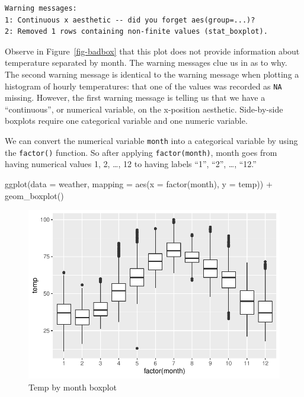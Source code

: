 \documentclass[
  letterpaper,
  DIV=11,
  numbers=noendperiod]{scrreprt}
\newenvironment{Shaded}{\begin{snugshade}}{\end{snugshade}}
\newcommand{\AttributeTok}[1]{\textcolor[rgb]{0.40,0.45,0.13}{#1}}
\newcommand{\FunctionTok}[1]{\textcolor[rgb]{0.28,0.35,0.67}{#1}}
\newcommand{\NormalTok}[1]{\textcolor[rgb]{0.00,0.23,0.31}{#1}}
\newcommand{\SpecialCharTok}[1]{\textcolor[rgb]{0.37,0.37,0.37}{#1}}
\theoremstyle{definition}
\theoremstyle{remark}
\begin{document}
\begin{verbatim}
Warning messages:
1: Continuous x aesthetic -- did you forget aes(group=...)? 
2: Removed 1 rows containing non-finite values (stat_boxplot). 
\end{verbatim}

Observe in Figure~\ref{fig-badbox} that this plot does not provide
information about temperature separated by month. The warning messages
clue us in as to why. The second warning message is identical to the
warning message when plotting a histogram of hourly temperatures: that
one of the values was recorded as \texttt{NA} missing. However, the
first warning message is telling us that we have a ``continuous'', or
numerical variable, on the x-position aesthetic. Side-by-side boxplots
require one categorical variable and one numeric variable.

We can convert the numerical variable \texttt{month} into a categorical
variable by using the \texttt{factor()} function. So after applying
\texttt{factor(month)}, month goes from having numerical values 1, 2,
\ldots, 12 to having labels ``1'', ``2'', \ldots, ``12.''

\begin{Shaded}
\begin{Highlighting}[]
\FunctionTok{ggplot}\NormalTok{(}\AttributeTok{data =}\NormalTok{ weather, }\AttributeTok{mapping =} \FunctionTok{aes}\NormalTok{(}\AttributeTok{x =} \FunctionTok{factor}\NormalTok{(month), }\AttributeTok{y =}\NormalTok{ temp)) }\SpecialCharTok{+}
  \FunctionTok{geom\_boxplot}\NormalTok{()}
\end{Highlighting}
\end{Shaded}

\begin{figure}[H]

{\centering \includegraphics{02-visualization_files/figure-pdf/fig-monthtempbox-1.pdf}

}

\caption{\label{fig-monthtempbox}Temp by month boxplot}

\end{figure}
\end{document}
